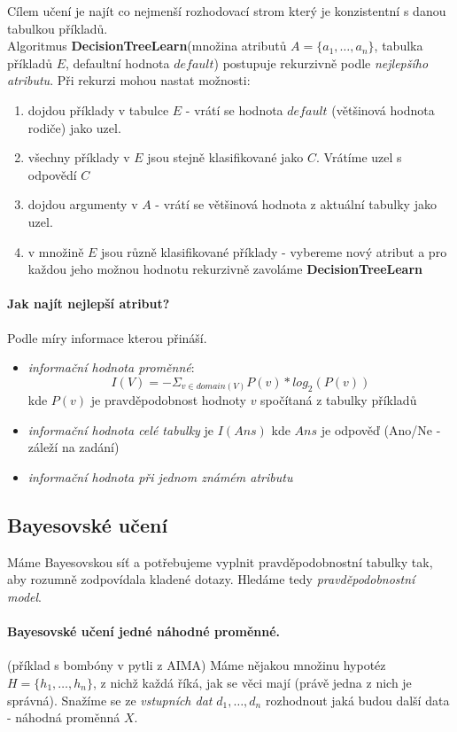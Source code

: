 \documentclass[a4paper]{article}      %
\begin{document}
Cílem učení je najít co nejmenší rozhodovací strom který je konzistentní s danou tabulkou příkladů.\\
Algoritmus \textbf{DecisionTreeLearn}(množina atributů $A=\lbrace a_1,\ldots,a_n\rbrace$, tabulka příkladů $E$, defaultní hodnota $default$)
postupuje rekurzivně podle \emph{nejlepšího atributu}. Při rekurzi mohou nastat možnosti:
\begin{enumerate}
\item dojdou příklady v tabulce $E$ - vrátí se hodnota $default$ (většinová hodnota rodiče) jako uzel.
\item všechny příklady v $E$ jsou stejně klasifikované jako $C$. Vrátíme uzel s odpovědí $C$
\item dojdou argumenty v $A$ - vrátí se většinová hodnota z aktuální tabulky jako uzel.
\item v množině $E$ jsou různě klasifikované příklady - vybereme nový atribut a pro každou jeho možnou hodnotu rekurzivně zavoláme \textbf{DecisionTreeLearn}
\end{enumerate} 

\paragraph{Jak najít nejlepší atribut?} Podle míry informace kterou přináší.
\begin{itemize}
\item \emph{informační hodnota proměnné}:
\[
I(V) = - \Sigma_{v \in domain(V)} P(v)*log_{2}(P(v))
\]
kde $P(v)$ je pravděpodobnost hodnoty $v$ spočítaná z tabulky příkladů
\item \emph{informační hodnota celé tabulky} je $I(Ans)$ kde $Ans$ je odpověď (Ano/Ne - záleží na zadání) 
\item \emph{informační hodnota při jednom známém atributu}
\end{itemize}

\subsection{Bayesovské učení}
Máme Bayesovskou síť a potřebujeme vyplnit pravděpodobnostní tabulky tak, aby rozumně zodpovídala kladené dotazy.
Hledáme tedy \emph{pravděpodobnostní model}.

\paragraph{Bayesovské učení jedné náhodné proměnné.} (příklad s bombóny v pytli z AIMA)
Máme nějakou množinu hypotéz $H = \lbrace h_{1},\ldots,h_{n} \rbrace$, z nichž každá říká, jak se věci mají (právě jedna z nich je správná).
Snažíme se ze \emph{vstupních dat} $d_1,\ldots,d_n$ rozhodnout jaká budou další data - náhodná proměnná $X$.
\end{document}
